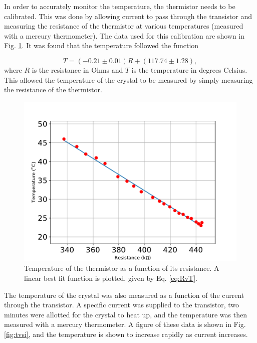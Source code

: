 In order to accurately monitor the temperature, the thermistor needs to be calibrated. This was done by allowing current to pass through the transistor and measuring the resistance of the thermistor at various temperatures (measured with a mercury thermometer). The data used for this calibration are shown in Fig. \ref{fig:rvt}. It was found that the temperature followed the function

\begin{equation}
	T = (-0.21 \pm 0.01)  R + (117.74 \pm 1.28),
	\label{eq:RvT}
\end{equation}
%
where $R$ is the resistance in Ohms and $T$ is the temperature in degrees Celsius. This allowed the temperature of the crystal to be measured by simply measuring the resistance of the thermistor.


\begin{figure}[h]
  \centering
  \includegraphics[width = .8\textwidth]{Images/bestfitRvT.pdf}
  \caption{Temperature of the thermistor as a function of its resistance. A linear best fit function is plotted, given by Eq. \ref{eq:RvT}.}
  \label{fig:rvt}
\end{figure}


The temperature of the crystal was also measured as a function of the current through the transistor. A specific current was supplied to the transistor, two minutes were allotted for the crystal to heat up, and the temperature was then measured with a mercury thermometer. A figure of these data is shown in Fig. \ref{fig:tvsi}, and the temperature is shown to increase rapidly as current increases.

